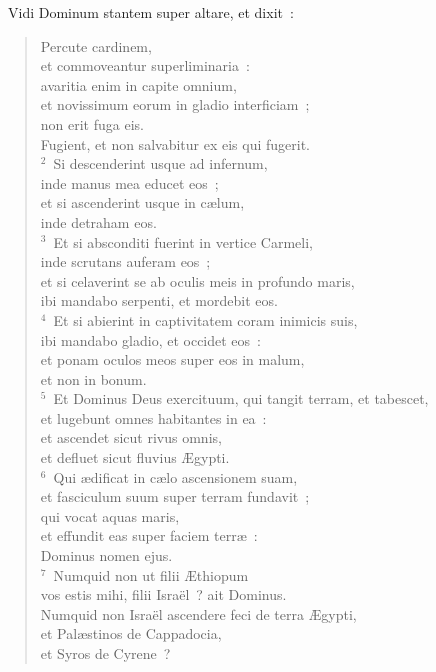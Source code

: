 ~Vidi Dominum stantem super altare, et dixit~: \begin{flushleft}\begin{verse}\vspace{6pt}Percute cardinem,\\ et commoveantur superliminaria~:\\ avaritia enim in capite omnium,\\ et novissimum eorum in gladio interficiam~;\\ non erit fuga eis.\\ Fugient, et non salvabitur ex eis qui fugerit.\\
${}^{2}$~Si descenderint usque ad infernum,\\ inde manus mea educet eos~;\\ et si ascenderint usque in c\ae lum,\\ inde detraham eos.\\
${}^{3}$~Et si absconditi fuerint in vertice Carmeli,\\ inde scrutans auferam eos~;\\ et si celaverint se ab oculis meis in profundo maris,\\ ibi mandabo serpenti, et mordebit eos.\\
${}^{4}$~Et si abierint in captivitatem coram inimicis suis,\\ ibi mandabo gladio, et occidet eos~:\\ et ponam oculos meos super eos in malum,\\ et non in bonum.\\
${}^{5}$~Et Dominus Deus exercituum, qui tangit terram, et tabescet,\\ et lugebunt omnes habitantes in ea~:\\ et ascendet sicut rivus omnis,\\ et defluet sicut fluvius \AE gypti.\\
${}^{6}$~Qui \ae dificat in c\ae lo ascensionem suam,\\ et fasciculum suum super terram fundavit~;\\ qui vocat aquas maris,\\ et effundit eas super faciem terr\ae~:\\ Dominus nomen ejus.\\
${}^{7}$~Numquid non ut filii \AE thiopum\\ vos estis mihi, filii Isra\"el~? ait Dominus.\\ Numquid non Isra\"el ascendere feci de terra \AE gypti,\\ et Pal\ae stinos de Cappadocia,\\ et Syros de Cyrene~?\end{verse}\end{flushleft}


